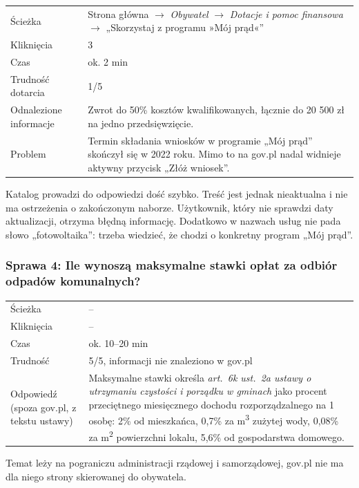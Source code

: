 \documentclass[11pt,a4paper]{article}
\begin{document}
\begin{tabularx}{\textwidth}{@{}L{3.6cm}Y@{}}
\toprule
Ścieżka & Strona główna $\rightarrow$ \textit{Obywatel} $\rightarrow$ \textit{Dotacje i pomoc finansowa} $\rightarrow$ „Skorzystaj z programu »Mój prąd«” \\
Kliknięcia & 3 \\
Czas & ok. 2 min \\
Trudność dotarcia & 1/5 \\
Odnalezione informacje & Zwrot do 50\% kosztów kwalifikowanych, łącznie do 20 500 zł na jedno przedsięwzięcie. \\
Problem & Termin składania wniosków w programie „Mój prąd” skończył się w 2022 roku. Mimo to na gov.pl nadal widnieje aktywny przycisk „Złóż wniosek”. \\
\bottomrule
\end{tabularx}

Katalog prowadzi do odpowiedzi dość szybko. Treść jest jednak nieaktualna i nie ma ostrzeżenia o zakończonym naborze. Użytkownik, który nie sprawdzi daty aktualizacji, otrzyma błędną informację. Dodatkowo w nazwach usług nie pada słowo „fotowoltaika”: trzeba wiedzieć, że chodzi o konkretny program „Mój prąd”.

\subsubsection*{Sprawa 4: Ile wynoszą maksymalne stawki opłat za odbiór odpadów komunalnych?}

\begin{tabularx}{\textwidth}{@{}L{3.6cm}Y@{}}
\toprule
Ścieżka & -- \\
Kliknięcia & -- \\
Czas & ok. 10--20 min \\
Trudność & 5/5, informacji nie znaleziono w gov.pl \\
Odpowiedź (spoza gov.pl, z tekstu ustawy) & Maksymalne stawki określa \textit{art.~6k ust.~2a ustawy o utrzymaniu czystości i porządku w gminach} jako procent przeciętnego miesięcznego dochodu rozporządzalnego na 1 osobę: 2\% od mieszkańca, 0,7\% za m\textsuperscript{3} zużytej wody, 0,08\% za m\textsuperscript{2} powierzchni lokalu, 5,6\% od gospodarstwa domowego. \\
\bottomrule
\end{tabularx}

Temat leży na pograniczu administracji rządowej i samorządowej, gov.pl nie ma dla niego strony skierowanej do obywatela.
\end{document}
